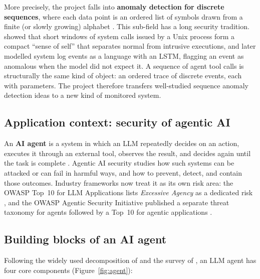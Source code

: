 \documentclass[11pt,a4paper]{article}
\begin{document}
More precisely, the project falls into \textbf{anomaly detection for discrete sequences}, where each data point is an ordered list of symbols drawn from a finite (or slowly growing) alphabet \citep{chandola2012discrete}. This sub-field has a long security tradition. \citet{forrest1996sense} showed that short windows of system calls issued by a Unix process form a compact ``sense of self'' that separates normal from intrusive executions, and \citet{du2017deeplog} later modelled system log events as a language with an LSTM, flagging an event as anomalous when the model did not expect it. A sequence of agent tool calls is structurally the same kind of object: an ordered trace of discrete events, each with parameters. The project therefore transfers well-studied sequence anomaly detection ideas to a new kind of monitored system.

\subsection{Application context: security of agentic AI}

An \textbf{AI agent} is a system in which an LLM repeatedly decides on an action, executes it through an external tool, observes the result, and decides again until the task is complete \citep{yao2023react,wang2024survey}. Agentic AI security studies how such systems can be attacked or can fail in harmful ways, and how to prevent, detect, and contain those outcomes. Industry frameworks now treat it as its own risk area: the OWASP Top~10 for LLM Applications lists \emph{Excessive Agency} as a dedicated risk \citep{owasp2025llmtop10,owasp2025llm06}, and the OWASP Agentic Security Initiative published a separate threat taxonomy for agents \citep{owasp2025agentic} followed by a Top~10 for agentic applications \citep{owasp2025agentictop10}.

\subsection{Building blocks of an AI agent}

Following the widely used decomposition of \citet{weng2023agents} and the survey of \citet{wang2024survey}, an LLM agent has four core components (Figure~\ref{fig:agent}):
\end{document}
